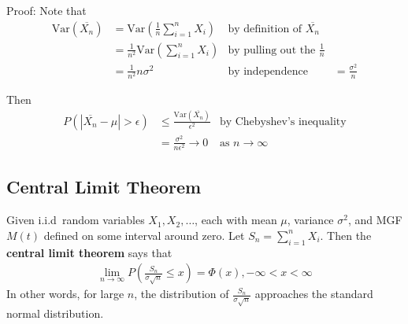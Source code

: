 \documentclass[a4paper,10pt]{article}
\newcommand{\Var}{\mathrm{Var}}
\begin{document}
Proof: Note that
\begin{align*}
    \Var(\overline{X_n}) &= \Var(\frac{1}{n}\sum_{i=1}^{n}X_i) &\text{by definition of $\overline{X_n}$} \\
    &= \frac{1}{n^2}\Var(\sum_{i=1}^{n}X_i) &\text{by pulling out the $\frac{1}{n}$} \\
    &= \frac{1}{n^2}n\sigma^2 &\text{by independence}
    &= \frac{\sigma^2}{n}
\end{align*}

Then 
\begin{align*}
    P(|\overline{X_n} - \mu| > \epsilon) &\leq \frac{\Var(\overline{X_n})}{\epsilon^2} &\text{by Chebyshev's inequality} \\
    &= \frac{\sigma^2}{n\epsilon^2} \to 0 &\text{as $n \to \infty$}
\end{align*}

\subsection{Central Limit Theorem}

Given i.i.d\ random variables $X_1, X_2, \ldots$, each with mean $\mu$, variance $\sigma^2$, and MGF $M(t)$ defined on some interval around zero. Let $S_n = \sum_{i=1}^{n} X_i$. Then the \textbf{central limit theorem} says that  
\begin{align*}
    \lim_{n\to \infty} P\left(\frac{S_n}{\sigma \sqrt{n}} \leq x\right) = \Phi(x), -\infty < x < \infty
\end{align*}
In other words, for large $n$, the distribution of $\frac{S_n}{\sigma \sqrt{n}}$ approaches the standard normal distribution. 
\end{document}
